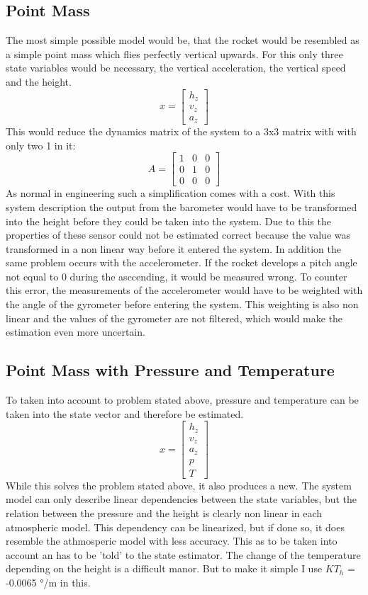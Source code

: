   \subsection{Point Mass}
  The most simple possible model would be, that the rocket would be resembled as a simple point mass which flies perfectly vertical upwards.
  For this only three state variables would be necessary, the vertical acceleration, the vertical speed and the height.
  $$x = \begin{bmatrix}
  h_z\\
  v_z\\
  a_z
  \end{bmatrix} $$ 
  This would reduce the dynamics matrix of the system to a 3x3 matrix with with only two 1 in it:
  $$ A = \begin{bmatrix}
  1 & 0 & 0\\
  0 & 1 & 0\\
  0 & 0 & 0
  \end{bmatrix} $$ 
  As normal in engineering such a simplification comes with a cost. With this system description the output from the barometer would have
  to be transformed into the height before they could be taken into the system. 
  Due to this the properties of these sensor could not be estimated correct because the value was transformed in a non linear way before it entered the system.
  In addition the same problem occurs with the accelerometer. If the rocket develops a pitch angle not equal to 0 during the asccending, it would be measured wrong.
  To counter this error, the measurements of the accelerometer would have to be weighted with the angle of the gyrometer before entering the system.
  This weighting is also non linear and the values of the gyrometer are not filtered, which would make the estimation even more uncertain.
  
  \subsection{Point Mass with Pressure and Temperature}
  To taken into account to problem stated above, pressure and temperature can be taken into the state vector and therefore be estimated.
    $$ x = \begin{bmatrix}
  h_z\\
  v_z\\
  a_z\\
  p\\
  T
  \end{bmatrix} $$ 
  While this solves the problem stated above, it also produces a new. The system model can only describe linear dependencies between the state variables,
  but the relation between the pressure and the height is clearly non linear in each atmospheric model.
  This dependency can be linearized, but if done so, it does resemble the athmosperic model with less accuracy.
  This as to be taken into account an has to be 'told' to the state estimator.
  The change of the temperature depending on the height is a difficult manor.
  But to make it simple I use $KT_h$ =  -0.0065 °/m in this.
  
